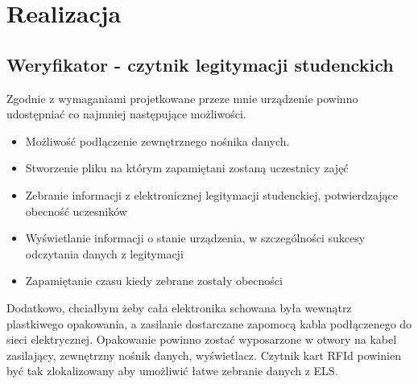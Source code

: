 \documentclass[declaration,shortabstract, mgr]{iithesis}
\begin{document}
\chapter{Realizacja}
\section{Weryfikator - czytnik legitymacji studenckich}
\indent Zgodnie z wymaganiami projetkowane przeze mnie urządzenie powinno udostępniać co najmniej następujące możliwości.
\begin{itemize}
\item Możliwość podłączenie zewnętrznego nośnika danych.
\item Stworzenie pliku na którym zapamiętani zostaną uczestnicy zajęć
\item Zebranie informacji z elektronicznej legitymacji studenckiej, potwierdzające obecność uczesników
\item Wyświetlanie informacji o stanie urządzenia, w szczególności sukcesy odczytania danych z legitymacji
\item Zapamiętanie czasu kiedy zebrane zostały obecności
\end{itemize}
\indent Dodatkowo, chciałbym żeby cała elektronika schowana była wewnątrz plastkiwego opakowania, a zasilanie dostarczane zapomocą kabla podłączenego do sieci elektrycznej. Opakowanie powinno zostać wyposarzone w otwory na kabel zasilający, zewnętrzny nośnik danych, wyświetlacz. Czytnik kart RFId powinien być tak zlokalizowany aby umożliwić łatwe zebranie danych z ELS.
\end{document}
